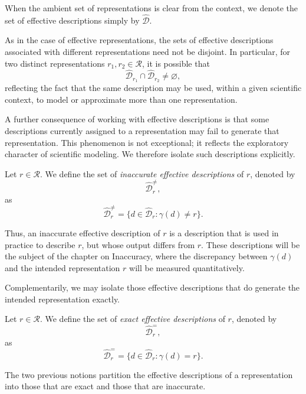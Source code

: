 \begin{notation}
When the ambient set of representations is clear from the context, we denote the set of effective
descriptions simply by \(\hat{\mathcal{D}}\).
\end{notation}

As in the case of effective representations, the sets of effective descriptions associated with
different representations need not be disjoint. In particular, for two distinct representations
\(r_1, r_2 \in \mathcal{R}\), it is possible that
\[
\hat{\mathcal{D}}_{r_1} \cap \hat{\mathcal{D}}_{r_2} \neq \varnothing,
\]
reflecting the fact that the same description may be used, within a given scientific context, to
model or approximate more than one representation.

A further consequence of working with effective descriptions is that some descriptions currently
assigned to a representation may fail to generate that representation. This phenomenon is not
exceptional; it reflects the exploratory character of scientific modeling. We therefore isolate such
descriptions explicitly.

\begin{definition}
Let \(r \in \mathcal{R}\). We define the set of \emph{inaccurate effective descriptions} of \(r\), denoted by
\[
\hat{\mathcal{D}}^{\neq}_r,
\]
as
\[
\hat{\mathcal{D}}^{\neq}_r
=
\{d \in \hat{\mathcal{D}}_r : \gamma(d) \neq r\}.
\]
\end{definition}

Thus, an inaccurate effective description of \(r\) is a description that is used in practice to
describe \(r\), but whose output differs from \(r\). These descriptions will be the subject of the
chapter on Inaccuracy, where the discrepancy between \(\gamma(d)\) and the intended representation
\(r\) will be measured quantitatively.

Complementarily, we may isolate those effective descriptions that do generate the intended
representation exactly.

\begin{definition}
Let \(r \in \mathcal{R}\). We define the set of \emph{exact effective descriptions} of \(r\), denoted by
\[
\hat{\mathcal{D}}^{=}_r,
\]
as
\[
\hat{\mathcal{D}}^{=}_r
=
\{d \in \hat{\mathcal{D}}_r : \gamma(d) = r\}.
\]
\end{definition}

The two previous notions partition the effective descriptions of a representation into those that
are exact and those that are inaccurate.

